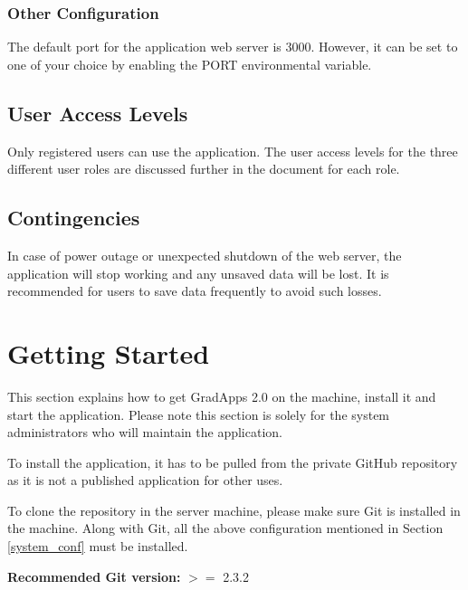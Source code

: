 \documentclass[fontsize=12pt,paper=letter,twoside]{scrartcl}
\begin{document}
\subsubsection{Other Configuration}
The default port for the application web server is 3000. However, it can be set to one of your choice by enabling the PORT environmental variable.

\subsection{User Access Levels}
Only registered users can use the application. The user access levels for the three different user roles are discussed further in the document for each role.

\subsection{Contingencies}
In case of power outage or unexpected shutdown of the web server, the application will stop working and any unsaved data will be lost. It is recommended for users to save data frequently to avoid such losses.

\newpage
\section{Getting Started}
This section explains how to get GradApps 2.0 on the machine, install it and start the application. Please note this section is solely for the system administrators who will maintain the application.

\bigskip
\noindent To install the application, it has to be pulled from the private GitHub repository as it is not a published application for other uses.

\bigskip
\noindent To clone the repository in the server machine, please make sure Git is installed in the machine. Along with Git, all the above configuration mentioned in Section \ref{system_conf} must be installed.

\bigskip
\noindent \textbf{Recommended Git version:} $>=$ 2.3.2
\end{document}
